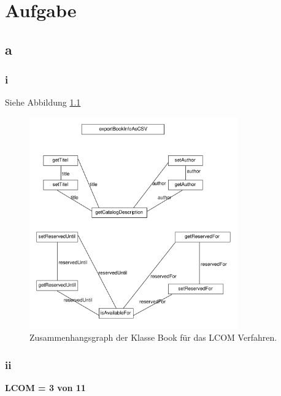 \label{key}\chapter{Aufgabe}
\section*{a}
\subsection*{i}
Siehe Abbildung \ref{fig:graphLCOM}

\begin{figure}[h!]
	\centering
	\includegraphics[width=0.8\textwidth, clip]{images/graphLCOM.pdf}
	\caption{Zusammenhangsgraph der Klasse Book für das  LCOM Verfahren. }
	\label{fig:graphLCOM}
\end{figure}
\subsection*{ii}
\textbf{LCOM = 3 von 11}



